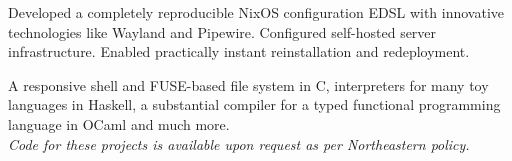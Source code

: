 \documentclass[letterpaper]{cv} %
\begin{document}
\begin{minipage}[t]{0.66\textwidth}
  Developed a completely reproducible NixOS configuration EDSL with innovative technologies like Wayland and Pipewire. Configured self-hosted server infrastructure. Enabled practically instant reinstallation and redeployment.\@ \sectionspace

  A responsive shell and FUSE-based file system in C,
  interpreters for many toy languages in Haskell,
  a substantial compiler for a typed functional programming language in OCaml and much more. \\
  \textit{Code for these projects is available upon request as per Northeastern policy.}

\end{minipage} %
\end{document}
